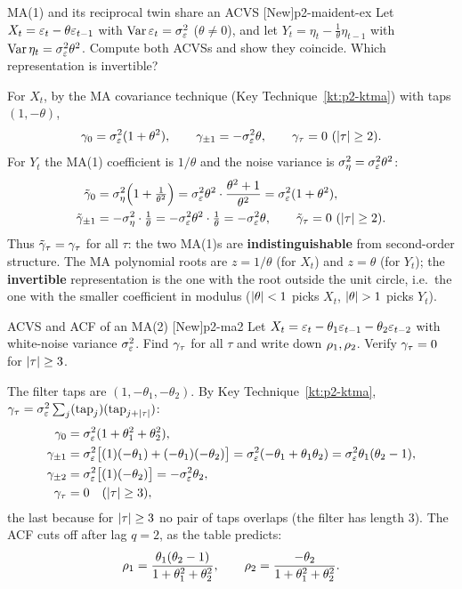 \begin{exercise}{MA(1) and its reciprocal twin share an ACVS \quad\textnormal{[New]}}{p2-maident-ex}
Let $X_t=\varepsilon_t-\theta\varepsilon_{t-1}$ with $\operatorname{Var}\varepsilon_t=\sigma_\varepsilon^2$ ($\theta\ne0$),
and let $Y_t=\eta_t-\tfrac1\theta\eta_{t-1}$ with $\operatorname{Var}\eta_t=\sigma_\varepsilon^2\theta^2$.
Compute both ACVSs and show they coincide. Which representation is invertible?
\end{exercise}
\begin{solution}
For $X_t$, by the MA covariance technique
(Key Technique~\ref{kt:p2-ktma}) with taps $(1,-\theta)$,
\[
\gamma_0=\sigma_\varepsilon^2(1+\theta^2),\qquad
\gamma_{\pm1}=-\sigma_\varepsilon^2\theta,\qquad
\gamma_\tau=0\ (\left\lvert \tau \right\rvert\ge2).
\]
For $Y_t$ the MA(1) coefficient is $1/\theta$ and the noise variance is
$\sigma_\eta^2=\sigma_\varepsilon^2\theta^2$:
\[
\begin{aligned}
\tilde{\gamma}_0&=\sigma_\eta^2\Big(1+\tfrac1{\theta^2}\Big)
=\sigma_\varepsilon^2\theta^2\cdot\frac{\theta^2+1}{\theta^2}
=\sigma_\varepsilon^2(1+\theta^2),\\
\tilde{\gamma}_{\pm1}&=-\sigma_\eta^2\cdot\tfrac1\theta
=-\sigma_\varepsilon^2\theta^2\cdot\tfrac1\theta=-\sigma_\varepsilon^2\theta,
\qquad \tilde{\gamma}_\tau=0\ (\left\lvert \tau \right\rvert\ge2).
\end{aligned}
\]
Thus $\tilde{\gamma}_\tau=\gamma_\tau$ for all $\tau$: the two MA(1)s are
\textbf{indistinguishable} from second-order structure. The MA polynomial roots
are $z=1/\theta$ (for $X_t$) and $z=\theta$ (for $Y_t$); the \textbf{invertible}
representation is the one with the root outside the unit circle, i.e.\ the one
with the smaller coefficient in modulus ($\left\lvert \theta \right\rvert<1$ picks $X_t$,
$\left\lvert \theta \right\rvert>1$ picks $Y_t$).
\end{solution}

\begin{exercise}{ACVS and ACF of an MA(2) \quad\textnormal{[New]}}{p2-ma2}
Let $X_t=\varepsilon_t-\theta_1\varepsilon_{t-1}-\theta_2\varepsilon_{t-2}$ with white-noise variance
$\sigma_\varepsilon^2$. Find $\gamma_\tau$ for all $\tau$ and write down $\rho_1,\rho_2$.
Verify $\gamma_\tau=0$ for $\left\lvert \tau \right\rvert\ge3$.
\end{exercise}
\begin{solution}
The filter taps are $(1,-\theta_1,-\theta_2)$. By Key
Technique~\ref{kt:p2-ktma},
$\gamma_\tau=\sigma_\varepsilon^2\sum_j(\text{tap}_j)(\text{tap}_{j+\left\lvert \tau \right\rvert})$:
\[
\begin{aligned}
\gamma_0&=\sigma_\varepsilon^2(1+\theta_1^2+\theta_2^2),\\
\gamma_{\pm1}&=\sigma_\varepsilon^2\big[(1)(-\theta_1)+(-\theta_1)(-\theta_2)\big]
=\sigma_\varepsilon^2(-\theta_1+\theta_1\theta_2)=\sigma_\varepsilon^2\theta_1(\theta_2-1),\\
\gamma_{\pm2}&=\sigma_\varepsilon^2\big[(1)(-\theta_2)\big]=-\sigma_\varepsilon^2\theta_2,\\
\gamma_\tau&=0\quad(\left\lvert \tau \right\rvert\ge3),
\end{aligned}
\]
the last because for $\left\lvert \tau \right\rvert\ge3$ no pair of taps overlaps (the filter has
length $3$). The ACF cuts off after lag $q=2$, as the table predicts:
\[
\rho_1=\frac{\theta_1(\theta_2-1)}{1+\theta_1^2+\theta_2^2},
\qquad
\rho_2=\frac{-\theta_2}{1+\theta_1^2+\theta_2^2}.
\]
\end{solution}

